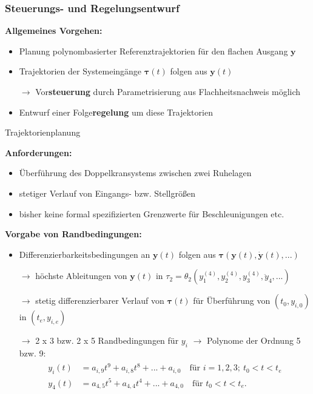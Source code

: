 \documentclass[
	ngerman,
	10pt,				%
	aspectratio=169 	%
]{beamer}
\begin{document}

\begin{frame}[label=control]
	\frametitle{Steuerungs- und Regelungsentwurf}
	\textbf{Allgemeines Vorgehen:}
	\begin{itemize}
		\item Planung polynombasierter Referenztrajektorien für den flachen Ausgang $\mathbf{y}$
		\pause
		\item Trajektorien der Systemeingänge $\boldsymbol{\tau}(t)$ folgen aus $\mathbf{y}(t)$
		\pause
		\item[$\rightarrow$] Vor\textbf{steuerung} durch Parametrisierung aus Flachheitsnachweis möglich
		\pause
		\item Entwurf einer Folge\textbf{regelung} um diese Trajektorien
	\end{itemize}

\end{frame}


\begin{frame}[t,fragile,label=trajektorien_1]{\large Trajektorienplanung}
	
	\textbf{Anforderungen:}
	\begin{itemize}
		\pause
		\item Überführung des Doppelkransystems zwischen zwei Ruhelagen
		\pause
		\item stetiger Verlauf von Eingangs- bzw. Stellgrößen
		\pause
		\item bisher keine formal spezifizierten Grenzwerte für Beschleunigungen etc.
	\end{itemize}
	
	\pause
	\bigskip
	\textbf{Vorgabe von Randbedingungen:}
	\begin{itemize}
		\pause
		\item Differenzierbarkeitsbedingungen an $\mathbf{y}(t)$ folgen aus $\boldsymbol{\tau}(\mathbf{y}(t), \dot{\mathbf{y}}(t), ...)$
		\pause
		\item[$\rightarrow$] höchste Ableitungen von $\mathbf{y}(t)$ in $\tau_2 = \theta_2 \left(y_1^{(4)}, y_2^{(4)}, y_3^{(4)}, \ddot{y}_4, ... \right)$
		\pause
		\item[$\rightarrow$] stetig differenzierbarer Verlauf von $\boldsymbol{\tau}(t)$ für Überführung von $(t_0, y_{i, 0})$ in $(t_e, y_{i, e})$
		\pause
		\item[$\rightarrow$] 2 x 3 bzw. 2 x 5 Randbedingungen für $y_i$ $\rightarrow$ Polynome der Ordnung 5 bzw. 9:
		\begin{align*}
			\begin{split}
				y_i(t) &= a_{i, 9} t^9 + a_{i, 8} t^8 + ... + a_{i, 0} \quad \text{für }  i = 1,2,3; \ t_0 < t < t_e \\
				y_4(t) &= a_{4, 5} t^5 + a_{4, 4} t^4 + ... + a_{4, 0} \quad \text{für } t_0 < t < t_e.
			\end{split}
		\end{align*}
		
	\end{itemize}
	
\end{frame}
\end{document}
